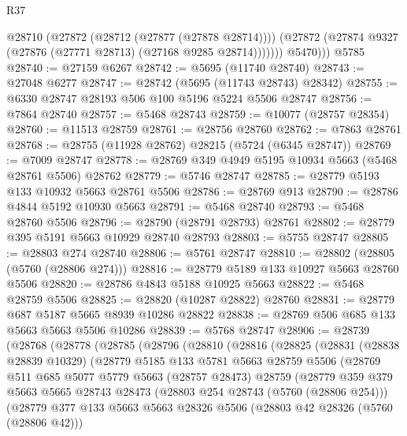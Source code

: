 \begin{lexlean}{R37}
\begin{coremodule}
            @28710
              (@27872 (@28712 (@27877 (@27878 @28714))))
              (@27872 (@27874 @9327 (@27876 (@27771 @28713) (@27168 @9285 @28714)))))))
          @5470)))
    @5785
@28740 := @27159 @6267
@28742 := @5695 (@11740 @28740)
@28743 := @27048 @6277
@28747 := @28742 (@5695 (@11743 @28743) @28342)
@28755 := @6330 @28747 @28193 @506 @100 @5196 @5224 @5506 @28747
@28756 := @7864 @28740
@28757 := @5468 @28743
@28759 := @10077 (@28757 @28354)
@28760 := @11513 @28759
@28761 := @28756 @28760
@28762 := @7863 @28761
@28768 := @28755 (@11928 @28762) @28215 (@5724 (@6345 @28747))
@28769 := @7009 @28747
@28778 := @28769 @349 @4949 @5195 @10934 @5663 (@5468 @28761 @5506) @28762
@28779 := @5746 @28747
@28785 := @28779 @5193 @133 @10932 @5663 @28761 @5506
@28786 := @28769 @913
@28790 := @28786 @4844 @5192 @10930 @5663
@28791 := @5468 @28740
@28793 := @5468 @28760 @5506
@28796 := @28790 (@28791 @28793) @28761
@28802 := @28779 @395 @5191 @5663 @10929 @28740 @28793
@28803 := @5755 @28747
@28805 := @28803 @274 @28740
@28806 := @5761 @28747
@28810 := @28802 (@28805 (@5760 (@28806 @274)))
@28816 := @28779 @5189 @133 @10927 @5663 @28760 @5506
@28820 := @28786 @4843 @5188 @10925 @5663
@28822 := @5468 @28759 @5506
@28825 := @28820 (@10287 @28822) @28760
@28831 := @28779 @687 @5187 @5665 @8939 @10286 @28822
@28838 := @28769 @506 @685 @133 @5663 @5663 @5506 @10286
@28839 := @5768 @28747
@28906 := @28739
    (@28768
      (@28778
        (@28785
          (@28796
            (@28810
              (@28816
                (@28825
                  (@28831
                    (@28838 @28839 @10329)
                    (@28779
                      @5185
                      @133
                      @5781
                      @5663
                      @28759
                      @5506
                      (@28769
                        @511
                        @685
                        @5077
                        @5779
                        @5663
                        (@28757 @28473)
                        @28759
                        (@28779
                          @359
                          @379
                          @5663
                          @5665
                          @28743
                          @28473
                          (@28803 @254 @28743 (@5760 (@28806 @254)))
                          (@28779
                            @377
                            @133
                            @5663
                            @5663
                            @28326
                            @5506
                            (@28803 @42 @28326 (@5760 (@28806 @42)))

\end{coremodule}
\end{lexlean}
